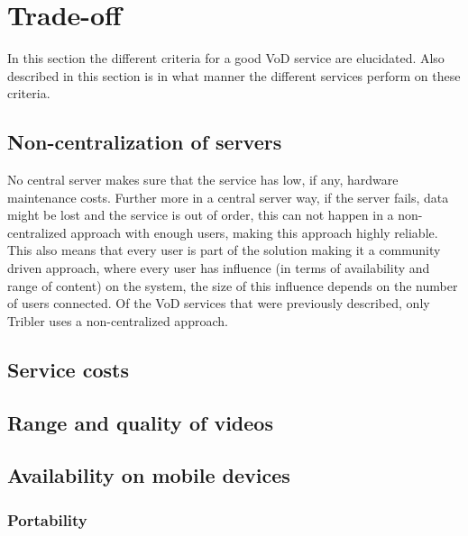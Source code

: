 \section{Trade-off}
In this section the different criteria for a good VoD service are elucidated. Also described in this section is in what manner the different services perform on these criteria.

\subsection{Non-centralization of servers}
No central server makes sure that the service has low, if any, hardware maintenance costs. Further more in a central server way, if the server fails, data might be lost and the service is out of order, this can not happen in a non-centralized approach with enough users, making this approach highly reliable. This also means that every user is part of the solution making it a community driven approach, where every user has influence (in terms of availability and range of content) on the system, the size of this influence depends on the number of users connected.
Of the VoD services that were previously described, only Tribler uses a non-centralized approach.
\subsection{Service costs}
\subsection{Range and quality of videos}
\subsection{Availability on mobile devices}
\subsubsection{Portability}
